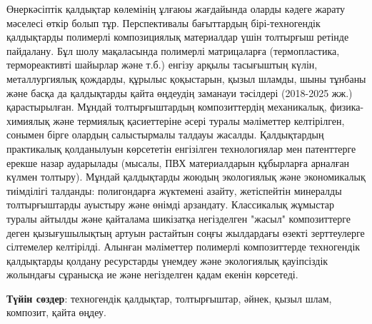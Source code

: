 Өнеркәсіптік қалдықтар көлемінің ұлғаюы жағдайында оларды кәдеге жарату
мәселесі өткір болып тұр. Перспективалы бағыттардың бірі-техногендік
қалдықтарды полимерлі композициялық материалдар үшін толтырғыш ретінде
пайдалану. Бұл шолу мақаласында полимерлі матрицаларға (термопластика,
термореактивті шайырлар және т.б.) енгізу арқылы тасығыштың күлін,
металлургиялық қождарды, құрылыс қоқыстарын, қызыл шламды, шыны тұнбаны
және басқа да қалдықтарды қайта өңдеудің заманауи тәсілдері (2018-2025
жж.) қарастырылған. Мұндай толтырғыштардың композиттердің механикалық,
физика-химиялық және термиялық қасиеттеріне әсері туралы мәліметтер
келтірілген, сонымен бірге олардың салыстырмалы талдауы жасалды.
Қалдықтардың практикалық қолданылуын көрсететін енгізілген технологиялар
мен патенттерге ерекше назар аударылады (мысалы, ПВХ материалдарын
құбырларға арналған күлмен толтыру). Мұндай қалдықтарды жоюдың
экологиялық және экономикалық тиімділігі талданды: полигондарға
жүктемені азайту, жетіспейтін минералды толтырғыштарды ауыстыру және
өнімді арзандату. Классикалық жұмыстар туралы айтылды және қайталама
шикізатқа негізделген "жасыл" композиттерге деген қызығушылықтың артуын
растайтын соңғы жылдардағы өзекті зерттеулерге сілтемелер келтірілді.
Алынған мәліметтер полимерлі композиттерде техногендік қалдықтарды
қолдану ресурстарды үнемдеу және экологиялық қауіпсіздік жолындағы
сұранысқа ие және негізделген қадам екенін көрсетеді.

{\bfseries Түйін сөздер}: техногендік қалдықтар, толтырғыштар, әйнек, қызыл
шлам, композит, қайта өңдеу.


